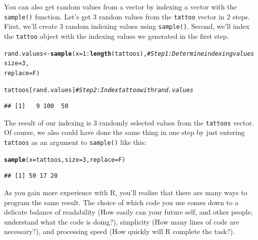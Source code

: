 \documentclass{tufte-book}\usepackage[]{graphicx}\usepackage[]{color}
\makeatletter
\newcommand{\hlnum}[1]{\textcolor[rgb]{0.686,0.059,0.569}{#1}}%
\newcommand{\hlcom}[1]{\textcolor[rgb]{0.678,0.584,0.686}{\textit{#1}}}%
\newcommand{\hlopt}[1]{\textcolor[rgb]{0,0,0}{#1}}%
\newcommand{\hlstd}[1]{\textcolor[rgb]{0.345,0.345,0.345}{#1}}%
\newcommand{\hlkwb}[1]{\textcolor[rgb]{0.69,0.353,0.396}{#1}}%
\newcommand{\hlkwc}[1]{\textcolor[rgb]{0.333,0.667,0.333}{#1}}%
\newcommand{\hlkwd}[1]{\textcolor[rgb]{0.737,0.353,0.396}{\textbf{#1}}}%
\newenvironment{kframe}{%
 \def\at@end@of@kframe{}%
 \ifinner\ifhmode%
  \def\at@end@of@kframe{\end{minipage}}%
  \begin{minipage}{\columnwidth}%
 \fi\fi%
 \def\FrameCommand##1{\hskip\@totalleftmargin \hskip-\fboxsep
 \colorbox{shadecolor}{##1}\hskip-\fboxsep
     \hskip-\linewidth \hskip-\@totalleftmargin \hskip\columnwidth}%
 \MakeFramed {\advance\hsize-\width
   \@totalleftmargin\z@ \linewidth\hsize
   \@setminipage}}%
 {\par\unskip\endMakeFramed%
 \at@end@of@kframe}
\newenvironment{knitrout}{}{} %
\makeatother
\begin{document}
\begin{footnotesize}
You can also get random values from a vector by indexing a vector with the \texttt{sample()} function. Let's get 3 random values from the \texttt{tattoo} vector in 2 steps. First, we'll create 3 random indexing values using \texttt{sample()}. Second, we'll index the \texttt{tattoo} object with the indexing values we generated in the first step.

\begin{footnotesize}
\begin{knitrout}
\color{fgcolor}\begin{kframe}
\begin{alltt}
\hlstd{rand.values} \hlkwb{<-} \hlkwd{sample}\hlstd{(}\hlkwc{x} \hlstd{=} \hlnum{1}\hlopt{:}\hlkwd{length}\hlstd{(tattoos),}  \hlcom{# Step 1: Determine indexing values}
                      \hlkwc{size} \hlstd{=} \hlnum{3}\hlstd{,}
                      \hlkwc{replace} \hlstd{= F)}

\hlstd{tattoos[rand.values]} \hlcom{# Step 2: Index tattoo with rand.values}
\end{alltt}
\begin{verbatim}
## [1]   9 100  50
\end{verbatim}
\end{kframe}
\end{knitrout}
\end{footnotesize}

The result of our indexing is 3 randomly selected values from the \texttt{tattoos} vector. Of course, we also could have done the same thing in one step by just entering \texttt{tattoos} as an argument to \texttt{sample()} like this:

\begin{footnotesize}
\begin{knitrout}
\color{fgcolor}\begin{kframe}
\begin{alltt}
\hlkwd{sample}\hlstd{(}\hlkwc{x} \hlstd{= tattoos,} \hlkwc{size} \hlstd{=} \hlnum{3}\hlstd{,} \hlkwc{replace} \hlstd{= F)}
\end{alltt}
\begin{verbatim}
## [1] 50 17 20
\end{verbatim}
\end{kframe}
\end{knitrout}
\end{footnotesize}

As you gain more experience with R, you'll realize that there are many ways to program the same result. The choice of which code you use comes down to a delicate balance of readability (How easily can your future self, and other people, understand what the code is doing?), simplicity (How many lines of code are necessary?), and processing speed (How quickly will R complete the task?).


\end{footnotesize}
\end{document}
